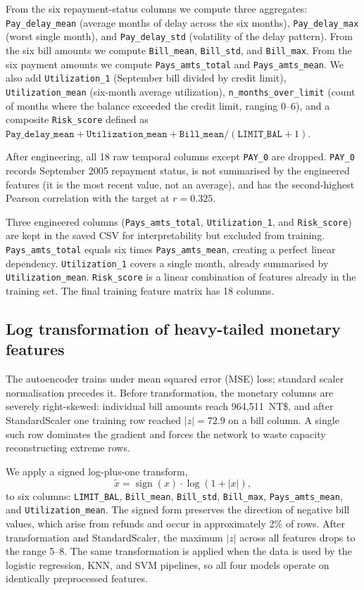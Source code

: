 \documentclass[12pt,a4paper]{article}
\begin{document}
From the six repayment-status columns we compute three aggregates:
\texttt{Pay\_delay\_mean} (average months of delay across the six months),
\texttt{Pay\_delay\_max} (worst single month), and
\texttt{Pay\_delay\_std} (volatility of the delay pattern). From the six
bill amounts we compute \texttt{Bill\_mean}, \texttt{Bill\_std}, and
\texttt{Bill\_max}. From the six payment amounts we compute
\texttt{Pays\_amts\_total} and \texttt{Pays\_amts\_mean}. We also add
\texttt{Utilization\_1} (September bill divided by credit limit),
\texttt{Utilization\_mean} (six-month average utilization),
\texttt{n\_months\_over\_limit} (count of months where the balance
exceeded the credit limit, ranging 0--6), and a composite
\texttt{Risk\_score} defined as
$\texttt{Pay\_delay\_mean} + \texttt{Utilization\_mean}
+ \texttt{Bill\_mean} / (\texttt{LIMIT\_BAL} + 1)$.

After engineering, all 18 raw temporal columns except \texttt{PAY\_0} are
dropped. \texttt{PAY\_0} records September 2005 repayment status, is not
summarised by the engineered features (it is the most recent value, not an
average), and has the second-highest Pearson correlation with the target
at $r = 0.325$.

Three engineered columns (\texttt{Pays\_amts\_total}, \texttt{Utilization\_1},
and \texttt{Risk\_score}) are kept in the saved CSV for interpretability but
excluded from training. \texttt{Pays\_amts\_total} equals six times
\texttt{Pays\_amts\_mean}, creating a perfect linear dependency.
\texttt{Utilization\_1} covers a single month, already summarised by
\texttt{Utilization\_mean}. \texttt{Risk\_score} is a linear combination
of features already in the training set. The final training feature matrix
has 18 columns.

\subsection{Log transformation of heavy-tailed monetary features}

The autoencoder trains under mean squared error (MSE) loss; standard scaler
normalisation precedes it. Before transformation, the monetary columns are
severely right-skewed: individual bill amounts reach 964,511~NT\$, and after
StandardScaler one training row reached $|z| = 72.9$ on a bill column. A
single such row dominates the gradient and forces the network to waste
capacity reconstructing extreme rows.

We apply a signed log-plus-one transform,
\begin{equation}
  \tilde{x} = \operatorname{sign}(x) \cdot \log(1 + |x|),
\end{equation}
to six columns: \texttt{LIMIT\_BAL}, \texttt{Bill\_mean}, \texttt{Bill\_std},
\texttt{Bill\_max}, \texttt{Pays\_amts\_mean}, and \texttt{Utilization\_mean}.
The signed form preserves the direction of negative bill values, which arise
from refunds and occur in approximately 2\% of rows. After transformation and
StandardScaler, the maximum $|z|$ across all features drops to the range
5--8. The same transformation is applied when the data is used by the
logistic regression, KNN, and SVM pipelines, so all four models operate on
identically preprocessed features.
\end{document}
